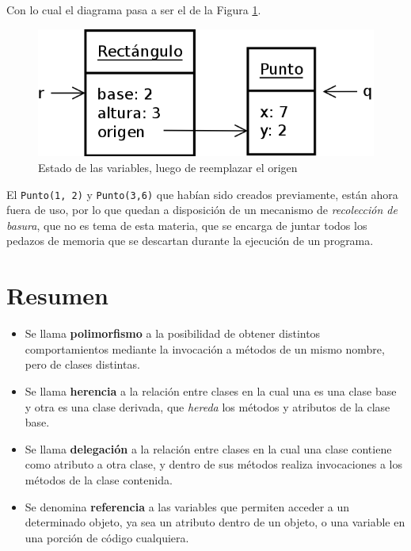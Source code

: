 Con lo cual el diagrama pasa a ser el de la Figura
\ref{rectangulo_punto_b}.

\begin{figure}[htb]
\label{rectangulo_punto_b}
\includegraphics{graficos/15_Rectangulo_Punto_b}
\caption{Estado de las variables, luego de reemplazar el origen}
\end{figure}

\begin{observacion}
El \lstinline!Punto(1, 2)! y \lstinline!Punto(3,6)! que habían sido creados
previamente, están ahora fuera de uso, por lo que quedan a disposición de un
mecanismo de {\it recolección de basura}, que no es tema de esta materia,
que se encarga de juntar todos los pedazos de memoria que se descartan
durante la ejecución de un programa.
\end{observacion}

\section{Resumen}

\begin{itemize}
\item Se llama {\bf polimorfismo} a la posibilidad de obtener distintos
comportamientos mediante la invocación a métodos de un mismo nombre, pero de
clases distintas.

\item Se llama {\bf herencia} a la relación entre clases en la cual una es una
clase base y otra es una clase derivada, que {\it hereda} los métodos y
atributos de la clase base.

\item Se llama {\bf delegación} a la relación entre clases en la cual una clase
contiene como atributo a otra clase, y dentro de sus métodos realiza
invocaciones a los métodos de la clase contenida.

\item Se denomina {\bf referencia} a las variables que permiten acceder a
un determinado objeto, ya sea un atributo dentro de un objeto, o una
variable en una porción de código cualquiera.
\end{itemize}


